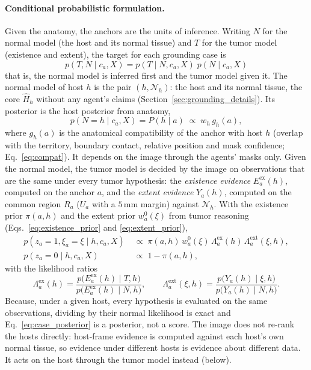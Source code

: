 \documentclass[fleqn,10pt]{olplainarticle}
\begin{document}
\paragraph{Conditional probabilistic formulation.}
Given the anatomy, the anchors are the units of inference. Writing $N$ for the normal model (the host and its normal
tissue) and $T$ for the tumor model (existence and extent), the target for each grounding case is
\begin{equation}
\label{eq:conditional_joint}
\boxed{
p(T,N\mid c_a,X)=p(T\mid N,c_a,X)\;p(N\mid c_a,X)
}
\end{equation}
that is, the normal model is inferred first and the tumor model given it. The normal model of host $h$ is the pair
$(h,\mathcal{N}_h)$: the host and its normal tissue, the core $\hat H_h$ without any agent's claims
(Section~\ref{sec:grounding_details}). Its posterior is the host posterior from anatomy,
\begin{equation}
\label{eq:normal_model}
p(N=h\mid c_a,X)=P(h\mid a)\;\propto\;w_h\,g_h(a),
\end{equation}
where $g_h(a)$ is the anatomical compatibility of the anchor with host $h$ (overlap with the territory, boundary contact,
relative position and mask confidence; Eq.~\eqref{eq:compat}). It depends on the image through the agents'
masks only. Given the normal model, the tumor model is decided by the image on observations that are the same under every
tumor hypothesis: the \emph{existence evidence} $E^{\mathrm{ex}}_a(h)$, computed on the anchor $a$, and the
\emph{extent evidence} $Y_a(h)$, computed on the common region $R_a$ ($U_a$ with a $5$\,mm margin) against
$\mathcal{N}_h$. With the existence prior $\pi(a,h)$ and the extent prior $w^0_a(\xi)$ from tumor reasoning
(Eqs.~\eqref{eq:existence_prior} and \eqref{eq:extent_prior}),
\begin{equation}
\label{eq:case_posterior}
\begin{aligned}
p(z_a=1,\xi_a=\xi\mid h,c_a,X)&\;\propto\;\pi(a,h)\,w^{0}_a(\xi)\,\Lambda^{\mathrm{ex}}_a(h)\,\Lambda^{\mathrm{ext}}_a(\xi,h),\\
p(z_a=0\mid h,c_a,X)&\;\propto\;1-\pi(a,h),
\end{aligned}
\end{equation}
with the likelihood ratios
\begin{equation}
\label{eq:likelihood_ratios}
\Lambda^{\mathrm{ex}}_a(h)=\frac{p\bigl(E^{\mathrm{ex}}_a(h)\mid T,h\bigr)}{p\bigl(E^{\mathrm{ex}}_a(h)\mid N,h\bigr)},\qquad
\Lambda^{\mathrm{ext}}_a(\xi,h)=\frac{p\bigl(Y_a(h)\mid \xi,h\bigr)}{p\bigl(Y_a(h)\mid N,h\bigr)}.
\end{equation}
Because, under a given host, every hypothesis is evaluated on the same observations, dividing by their normal likelihood
is exact and Eq.~\eqref{eq:case_posterior} is a posterior, not a score. The image does not re-rank the hosts directly:
host-frame evidence is computed against each host's own normal tissue, so evidence under different hosts is evidence about
different data. It acts on the host through the tumor model instead (below).
\end{document}

